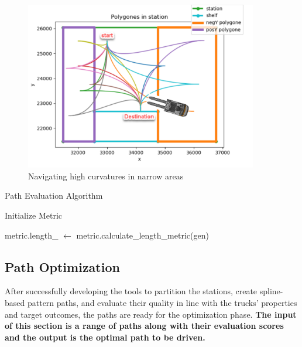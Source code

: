 \begin{figure}[H]
    \begin{center}
        \includegraphics[width=4in]{images/Chap2/curv_problem.png} %
        \caption{Navigating high curvatures in narrow areas}
        \label{curv_problem}
        \end{center}    
\end{figure}

\begin{algorithm}[H]
    \caption{Path Evaluation Algorithm}\label{EvaluationAlgorithm}

    \SetAlgoLined
    
    Initialize Metric\;
    
    
    metric.length\_ $\gets$ metric.calculate\_length\_metric(gen)\;
    
    
    \;
\end{algorithm}

\newpage
\subsection{Path Optimization}
After successfully developing the tools to partition the stations, create spline-based pattern paths, and evaluate their quality 
in line with the trucks' properties and target outcomes, the paths are ready for the optimization phase.
\textbf{The input of this section is a range of paths along with their evaluation scores and the output is the optimal 
path to be driven.}

